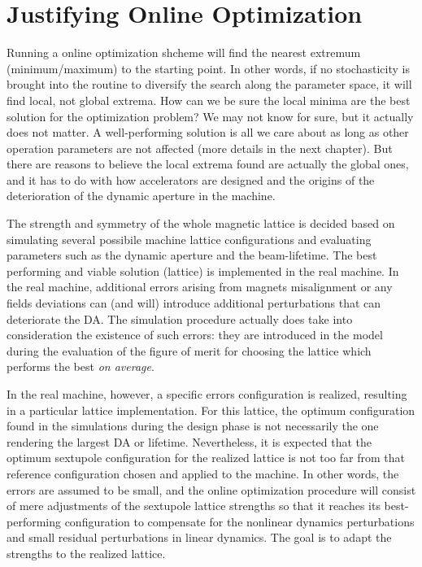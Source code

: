 \section{Justifying Online Optimization}
Running  a online optimization shcheme will find the nearest extremum (minimum/maximum) to the starting point. In other words, if no stochasticity is brought into the routine to diversify the search along the parameter space, it will find local, not global extrema. How can we be sure the local minima are the best solution for the optimization problem? We may not know for sure, but it actually does not matter. A well-performing solution is all we care about as long as other operation parameters are not affected (more details in the next chapter). But there are reasons to believe the local extrema found are actually the global ones, and it has to do with how accelerators are designed and the origins of the deterioration of the dynamic aperture in the machine.

The strength and symmetry of the whole magnetic lattice is decided based on simulating several possibile machine lattice configurations and evaluating parameters such as the dynamic aperture and the beam-lifetime. The best performing and viable solution (lattice) is implemented in the real machine. In the real machine, additional errors arising from magnets misalignment or any fields deviations can (and will) introduce additional perturbations that can deteriorate the DA. The simulation procedure actually does take into consideration the existence of such errors: they are introduced in the model during the evaluation of the figure of merit for choosing the lattice which performs the best \textit{on average}. 

In the real machine, however, a specific errors configuration is realized, resulting in a particular lattice implementation. For this lattice, the optimum configuration found in the simulations during the design phase is not necessarily the one rendering the largest DA or lifetime. Nevertheless, it is expected that the optimum sextupole configuration for the realized lattice is not too far from that reference configuration chosen and applied to the machine. In other words, the errors are assumed to be small, and the online optimization procedure will consist of mere adjustments of the sextupole lattice strengths so that it reaches its best-performing configuration to compensate for the nonlinear dynamics perturbations and small residual perturbations in linear dynamics. The goal is to adapt the strengths to the realized lattice.

